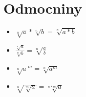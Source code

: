 \documentclass[main.tex]{subfiles}
\begin{document}
\section*{Odmocniny}
\begin{multicols}{2}
  \begin{itemize}
    \item $\sqrt[n]{a}*\sqrt[n]{b}=\sqrt[n]{a*b}$
    \item $\frac{\sqrt[n]{a}}{\sqrt[n]{b}}=\sqrt[n]{\frac{a}{b}}$
  \columnbreak
    \item $\sqrt[n]{a}^m =\sqrt[n]{a^m}$
    \item $\sqrt[n]{\sqrt[m]{a}}=\sqrt[n*m]{a}$
  \end{itemize}
\end{multicols}
\end{document}
